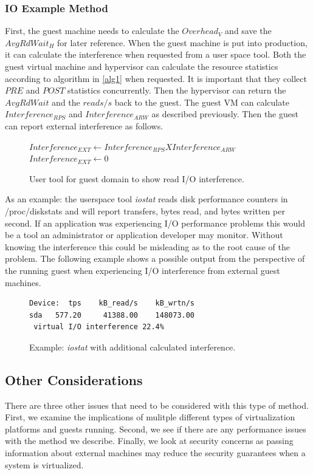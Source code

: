 \subsubsection{IO Example Method}
First, the guest machine needs to calculate the $Overhead_V$ and save the $AvgRdWait_H$ for later reference.  When the guest machine is put into production, it can calculate the interference when requested from a user space tool.  Both the guest virtual machine and hypervisor can calculate the resource statistics according to algorithm in \ref{alg1} when requested.  It is important that they collect $PRE$ and $POST$ statistics concurrently.  Then the hypervisor can return the $AvgRdWait$ and the $reads/s$ back to the guest.   The guest VM can calculate $Interference_{RPS}$ and $Interference_{ARW}$ as described previously.   Then the guest can report external interference as follows.

\begin{figure}[h]
\begin{algorithmic}[H]
 \STATE $Interference_{EXT} \gets Interference_{RPS} X Interference_{ARW}$  
 	\STATE $Interference_{EXT} \gets 0$
 \ENDIF
\end{algorithmic}
\label{alg2}
\caption{User tool for guest domain to show read I/O interference.}
\end{figure}

\indent As an example: the userspace tool \emph{iostat} reads disk performance counters in /proc/diskstats and will report transfers, bytes read, and bytes written per second.  If an application was experiencing I/O performance problems this would be a tool an administrator or application developer may monitor.  Without knowing the interference this could be misleading as to the root cause of the problem.  The following example shows a possible output from the perspective of the running guest when experiencing I/O interference from external guest machines.

\begin{figure}[h]
\begin{Verbatim}
Device:  tps    kB_read/s    kB_wrtn/s
sda   577.20     41388.00    148073.00
 virtual I/O interference 22.4%     
\end{Verbatim}
\label{fig:iostat}
\caption{Example:  \emph{iostat} with additional calculated interference.}
\end{figure}

\subsection{Other Considerations}
There are three other issues that need to be considered with this type of method.  First, we examine the implications of mulitple different types of virtualization platforms and guests running.  Second, we see if there are any performance issues with the method we describe.  Finally, we look at security concerns as passing information about external machines may reduce the security guarantees when a system is virtualized.

